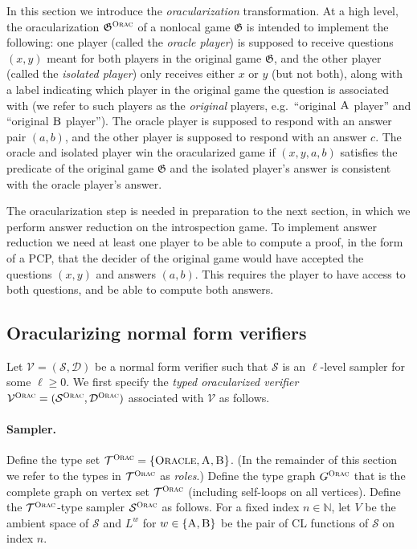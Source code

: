 \documentclass[11pt]{article}
\theoremstyle{definition}
\newcommand{\N}{\ensuremath{\mathbb{N}}}
\newcommand{\game}{\mathfrak{G}}
\newcommand{\sampler}{\mathcal{S}}
\newcommand{\decider}{\mathcal{D}}
\newcommand{\verifier}{\mathcal{V}}
\newcommand{\type}{\mathcal{T}}
\newcommand{\gamestyle}[1]{\ensuremath{\textsc{#1}}\xspace}
\newcommand{\ora}{\gamestyle{Orac}}
\newcommand{\labelstyle}[1]{\ensuremath{\textsc{#1}}\xspace}
\newcommand{\alice}{\labelstyle{A}}
\newcommand{\bob}{\labelstyle{B}}
\newcommand{\oracle}{\labelstyle{Oracle}}
\newcommand{\ab}{\{\alice, \bob\}}
\begin{document}
In this section we introduce the \emph{oracularization} transformation.
At a high level, the oracularization $\game^\ora$ of a nonlocal game $\game$ is
intended to implement the following: one player (called the \emph{oracle
  player}) is supposed to receive questions $(x,y)$ meant for both players in
the original game $\game$, and the other player (called the \emph{isolated
  player}) only receives either $x$ or $y$ (but not both), along with a label
indicating which player in the original game the question is associated with (we
refer to such players as the \emph{original} players, e.g.\ ``original $\alice$
player'' and ``original $\bob$ player'').
The oracle player is supposed to respond with an answer pair $(a,b)$, and the
other player is supposed to respond with an answer $c$.
The oracle and isolated player win the oracularized game if $(x,y,a,b)$
satisfies the predicate of the original game $\game$ and the isolated player's
answer is consistent with the oracle player's answer.

The oracularization step is needed in preparation to the next section, in which
we perform answer reduction on the introspection game.
To implement answer reduction we need at least one player to be able to compute
a proof, in the form of a PCP, that the decider of the original game would have
accepted the questions $(x,y)$ and answers $(a,b)$.
This requires the player to have access to both questions, and be able to
compute both answers.

\subsection{Oracularizing normal form verifiers}
\label{sec:orac-def}

Let $\verifier = (\sampler,\decider)$ be a normal form verifier such that
$\sampler$ is an $\ell$-level sampler for some $\ell \geq 0$.
We first specify the \emph{typed oracularized verifier} $\verifier^\ora =
(\sampler^\ora,\decider^\ora)$ associated with $\verifier$ as follows.

\paragraph{Sampler.}
Define the type set $\type^\ora = \{\oracle,\alice,\bob\}$.
(In the remainder of this section we refer to the types in $\type^\ora$ as
\emph{roles}.)
Define the type graph $G^\ora$ that is the complete graph on vertex set
$\type^\ora$ (including self-loops on all vertices).
Define the $\type^\ora$-type sampler $\sampler^\ora$ as follows.
For a fixed index $n \in \N$, let $V$ be the ambient space of $\sampler$ and
$L^w$ for $w \in \ab $ be the pair of CL functions of $\sampler$ on index $n$.
\end{document}
